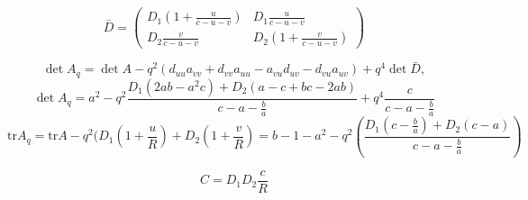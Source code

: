 \documentclass{article}
\newcommand{\tr}{\text{tr}}
\begin{document}
\begin{equation}
\bar{D} = \begin{pmatrix} D_1(1+\frac{u}{c-u-v}) & D_1\frac{u}{c-u-v}\\ D_2\frac{v}{c-u-v} & D_2(1+\frac{v}{c-u-v})\end{pmatrix} 
\end{equation}

	\begin{equation}
	\det A_{q}=\det A-q^2\left(d_{uu}a_{vv}+d_{vv}a_{uu}-a_{vu}d_{uv}-d_{vu}a_{uv}\right)+q^4 \det \bar{D},
	\end{equation}
	\begin{equation}
	\det A_q = a^2 - q^2\frac{D_1(2ab-a^2c)+D_2(a-c+bc-2ab)}{c-a-\frac{b}{a}}+q^4\frac{c}{c-a-\frac{b}{a}}
	\end{equation}
	\begin{equation}
	\tr A_q = \tr A - q^2 (D_1 (1+\frac uR) + D_2 (1+\frac vR)=b-1-a^2 - q^2 (\frac{D_1(c-\frac{b}{a})+D_2(c-a)}{c-a-\frac{b}{a}})
	\end{equation}
	
	\begin{equation}
	C = D_1D_2 \frac{c}{R}
	\end{equation}
	
\end{document}

